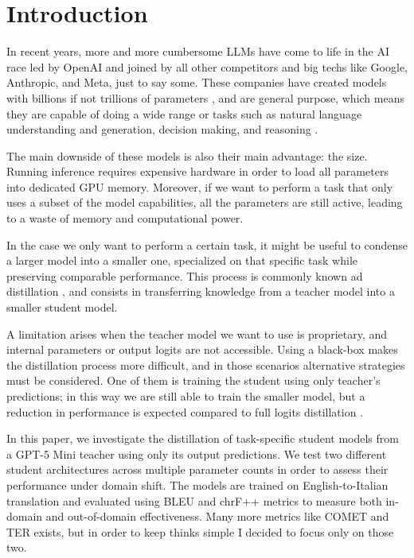 \documentclass[pdflatex,sn-mathphys-num]{sn-jnl}%
\theoremstyle{thmstyleone}%
\theoremstyle{thmstyletwo}%
\theoremstyle{thmstylethree}%
\begin{document}
\section{Introduction}\label{sec1}

In recent years, more and more cumbersome LLMs have come to life in the AI race led by OpenAI and joined by all other competitors and big techs like Google, Anthropic, and Meta, just to say some. These companies have created models with billions if not trillions of parameters \cite{abacha2025medec}, and are general purpose, which means they are capable of doing a wide range or tasks such as natural language understanding and generation, decision making, and reasoning \cite{ye2025llms4allreviewlargelanguage}.

The main downside of these models is also their main advantage: the size. Running inference requires expensive hardware in order to load all parameters into dedicated GPU memory. Moreover, if we want to perform a task that only uses a subset of the model capabilities, all the parameters are still active, leading to a waste of memory and computational power.

In the case we only want to perform a certain task, it might be useful to condense a larger model into a smaller one, specialized on that specific task while preserving comparable performance. This process is commonly known ad distillation \cite{hinton2015distilling}, and consists in transferring knowledge from a teacher model into a smaller student model.

A limitation arises when the teacher model we want to use is proprietary, and internal parameters or output logits are not accessible. Using a black-box makes the distillation process more difficult, and in those scenarios alternative strategies must be considered. One of them is training the student using only teacher's predictions; in this way we are still able to train the smaller model, but a reduction in performance is expected compared to full logits distillation \cite{yang2025survey}.

In this paper, we investigate the distillation of task-specific student models from a GPT-5 Mini teacher using only its output predictions. We test two different student architectures across multiple parameter counts in order to assess their performance under domain shift. The models are trained on English-to-Italian translation and evaluated using BLEU and chrF++ metrics to measure both in-domain and out-of-domain effectiveness. Many more metrics like COMET and TER exists, but in order to keep thinks simple I decided to focus only on those two.
\end{document}
